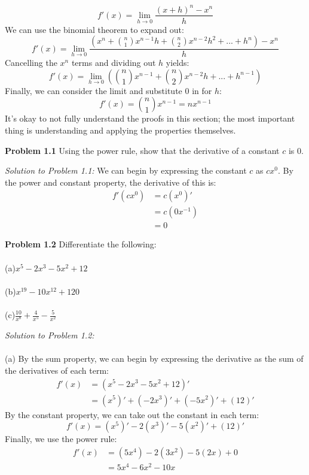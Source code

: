 \documentclass[11pt]{scrartcl}
\begin{document}
$$f'(x)=\lim_{h \to 0} \frac{(x+h)^n-x^n}{h}$$
We can use the binomial theorem to expand out:
$$f'(x)=\lim_{h \to 0} \frac{\left(x^n+{n \choose 1}x^{n-1}h+{n \choose 2}x^{n-2}h^2+...+h^n\right)-x^n}{h}$$
Cancelling the $x^n$ terms and dividing out $h$ yields:
$$f'(x)=\lim_{h \to 0} \left({n \choose 1}x^{n-1}+{n \choose 2}x^{n-2}h+...+h^{n-1}\right)$$
Finally, we can consider the limit and substitute 0 in for $h$:
$$f'(x)={n \choose 1}x^{n-1}=nx^{n-1}$$
\noindent 
It's okay to not fully understand the proofs in this section; the most important thing is understanding and applying the properties themselves.
\begin{tcolorbox}
[colback=purple!5!white,colframe=purple!75!black]
\textbf{Problem 1.1} Using the power rule, show that the derivative of a constant $c$ is 0.
\end{tcolorbox}
\noindent
\textit{Solution to Problem 1.1:} We can begin by expressing the constant $c$ as $cx^0$. By the power and constant property, the derivative of this is:
\begin{align*}
f'(cx^0) &=c(x^0)' \\
         &=c(0x^{-1}) \\
         &=0
\end{align*}
\begin{tcolorbox}
[colback=purple!5!white,colframe=purple!75!black]
\textbf{Problem 1.2} Differentiate the following: \\
\noindent\\
(a)\;\;\;\;$x^5-2x^3-5x^2+12$\\
\noindent\\
(b)\;\;\;\;$x^{19}-10x^{12}+120$\\
\noindent\\
(c)\;\;\;\;$\frac{10}{x^8}+\frac{4}{x^5}-\frac{5}{x^2}$
\end{tcolorbox}
\noindent
\textit{Solution to Problem 1.2:}\\
\noindent\\
(a) By the sum property, we can begin by expressing the derivative as the sum of the derivatives of each term:
\begin{align*}
    f'(x) & = (x^5-2x^3-5x^2+12)'\\
& = (x^5)'+(-2x^3)'+(-5x^2)'+(12)'
\end{align*}
By the constant property, we can take out the constant in each term:
$$f'(x)=(x^5)'-2(x^3)'-5(x^2)'+(12)'$$
Finally, we use the power rule: 
\begin{align*}
f'(x)& = (5x^4)-2(3x^2)-5(2x)+0\\
     & = 5x^4-6x^2-10x
\end{align*}
\end{document}
